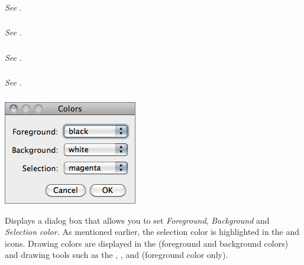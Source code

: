 \subsubsection[\protect\userinterface{Rounded Rect Tool\ldots{}}]{\protect{}}

\emph{See} .


\subsubsection{\protect{}}

\emph{See} .


\subsubsection{\protect{}\label{sub:Point-Tool...}}

\emph{See} .


\subsubsection{\protect{}\label{sub:Wand-Tool...}}

\emph{See} .


\subsubsection{\protect{}\label{sub:Colors...}}

\begin{minipage}[c][1\totalheight][t]{0.325\columnwidth}%
\includegraphics[scale=0.55]{images/Colors}%
\end{minipage}%
\begin{minipage}[c][1\totalheight][t]{0.675\columnwidth}%
Displays a dialog box that allows you to set \emph{Foreground}, \emph{Background}
and \emph{Selection color. }As mentioned earlier, the selection color
is highlighted in the  and 
icons. Drawing colors are displayed in the 
(foreground and background colors) and drawing tools such as the ,
,  and 
(foreground color only).%
\end{minipage}



